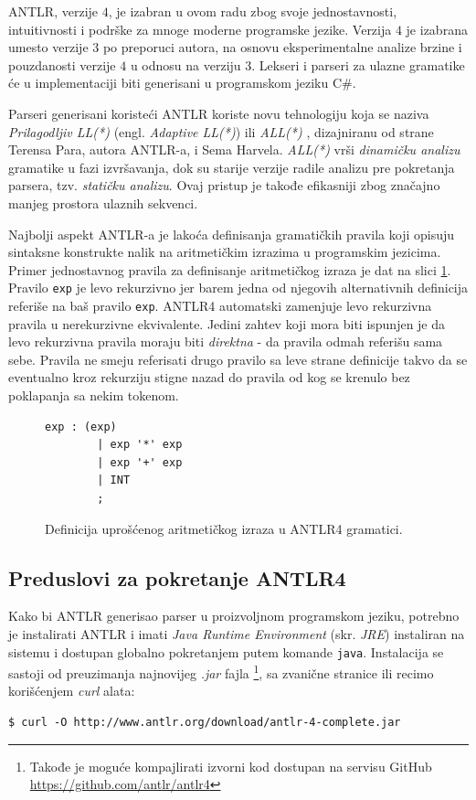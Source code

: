 ANTLR, verzije $4$, je izabran u ovom radu zbog svoje jednostavnosti, intuitivnosti i podrške za mnoge moderne programske jezike. Verzija $4$ je izabrana umesto verzije $3$ po preporuci autora, na osnovu eksperimentalne analize brzine i pouzdanosti verzije $4$ u odnosu na verziju $3$. Lekseri i parseri za ulazne gramatike će u implementaciji biti generisani u programskom jeziku C\#.

Parseri generisani koristeći ANTLR koriste novu tehnologiju koja se naziva \emph{Prilagodljiv LL(*)} (engl. \emph{Adaptive LL(*)}) ili \emph{ALL(*)} \cite{ANTLRReference}, dizajniranu od strane Terensa Para, autora ANTLR-a, i Sema Harvela. \emph{ALL(*)} vrši \emph{dinamičku analizu} gramatike u fazi izvršavanja, dok su starije verzije radile analizu pre pokretanja parsera, tzv. \emph{statičku analizu}. Ovaj pristup je takođe efikasniji zbog značajno manjeg prostora ulaznih sekvenci.

Najbolji aspekt ANTLR-a je lakoća definisanja gramatičkih pravila koji opisuju sintaksne konstrukte nalik na aritmetičkim izrazima u programskim jezicima. Primer jednostavnog pravila za definisanje aritmetičkog izraza je dat na slici \ref{fig:ANTLRExpressions}. Pravilo \texttt{exp} je levo rekurzivno jer barem jedna od njegovih alternativnih definicija referiše na baš pravilo \texttt{exp}. ANTLR4 automatski zamenjuje levo rekurzivna pravila u nerekurzivne ekvivalente. Jedini zahtev koji mora biti ispunjen je da levo rekurzivna pravila moraju biti \emph{direktna} - da pravila odmah referišu sama sebe. Pravila ne smeju referisati drugo pravilo sa leve strane definicije takvo da se eventualno kroz rekurziju stigne nazad do pravila od kog se krenulo bez poklapanja sa nekim tokenom.

\begin{figure}[h!]
    \begin{lstlisting}[language={}]
    exp : (exp)
        | exp '*' exp
        | exp '+' exp
        | INT
        ;
    \end{lstlisting}
    \caption{Definicija uprošćenog aritmetičkog izraza u ANTLR4 gramatici.}
    \label{fig:ANTLRExpressions}
\end{figure}


\subsection{Preduslovi za pokretanje ANTLR4}
\label{subsec:ANTLRInstallation}

Kako bi ANTLR generisao parser u proizvoljnom programskom jeziku, potrebno je instalirati ANTLR i imati \emph{Java Runtime Environment} (skr. \emph{JRE}) instaliran na sistemu i dostupan globalno pokretanjem putem komande \texttt{java}. Instalacija se sastoji od preuzimanja najnovijeg \emph{.jar} fajla
\footnote{Takođe je moguće kompajlirati izvorni kod dostupan na servisu GitHub \url{https://github.com/antlr/antlr4}}, sa zvanične stranice \cite{ANTLR} ili recimo korišćenjem \emph{curl} alata: 
\begin{lstlisting}[language={}]
$ curl -O http://www.antlr.org/download/antlr-4-complete.jar
\end{lstlisting}


